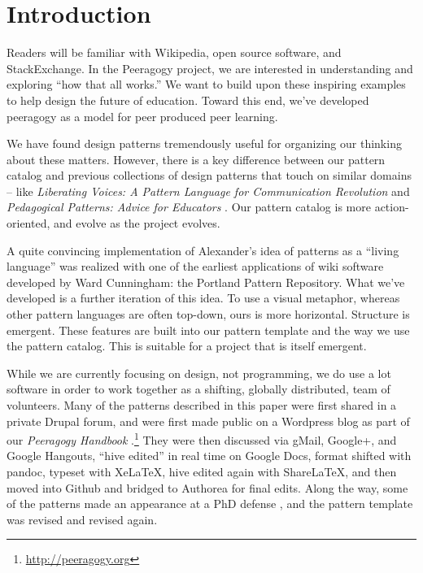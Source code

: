 \section{Introduction}\label{sec:Introduction}

Readers will be familiar with Wikipedia, open source software, and StackExchange.  In the Peeragogy project, we are interested in understanding and exploring ``how that all works.''    We want to build upon these inspiring examples to help design the future of education.  Toward this end, we've developed peeragogy as a model for peer produced peer learning.

We have found design patterns tremendously useful for organizing our thinking about these matters.  However, there is a key difference between our pattern catalog and previous collections of design patterns that touch on similar domains -- like \emph{Liberating Voices: A Pattern Language for Communication Revolution} \cite{schuler2008liberating} and \emph{Pedagogical Patterns: Advice for Educators} \cite{bergin2012pedagogical}.  Our pattern catalog is more action-oriented, and evolve as the project evolves.   

A quite convincing implementation of Alexander’s idea of patterns as a ``living language'' \cite[p.~xvii]{alexander1977pattern} was realized with one of the earliest applications of wiki software developed by Ward Cunningham: the Portland Pattern Repository. What we've developed is a further iteration of this idea. To use a visual metaphor, whereas other pattern languages are often top-down, ours is more horizontal.  Structure is emergent.  These features are built into our pattern template and the way we use the pattern catalog.  This is suitable for a project that is itself emergent.

While we are currently focusing on design, not programming, we do use a lot software in order to work together as a shifting, globally distributed, team of volunteers.  Many of the patterns described in this paper were first shared in a private Drupal forum, and were first made public on a Wordpress blog as part of our \emph{Peeragogy Handbook} \cite{peeragogy-handbook}.\footnote{\url{http://peeragogy.org}}  They were then discussed via gMail, Google+, and Google Hangouts, ``hive edited'' in real time on Google Docs, format shifted with pandoc, typeset with XeLaTeX, hive edited again with ShareLaTeX, and then moved into Github and bridged to Authorea for final edits.  Along the way, some of the patterns made an appearance at a PhD defense \cite{corneli-thesis}, and the pattern template was revised and revised again.  

